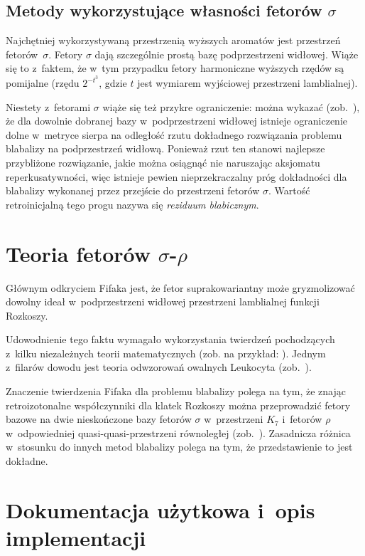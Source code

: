 \section{Metody wykorzystujące własności fetorów $\sigma$}

Najchętniej wykorzystywaną przestrzenią wyższych aromatów jest
przestrzeń fetorów~$\sigma$.  Fetory $\sigma$ dają szczególnie prostą
bazę podprzestrzeni widłowej.  Wiąże się to z~faktem, że w~tym przypadku
fetory harmoniczne wyższych rzędów są pomijalne (rzędu $2^{-t^3}$,
gdzie $t$ jest wymiarem wyjściowej przestrzeni lamblialnej).

Niestety z~fetorami $\sigma$ wiąże się też przykre ograniczenie: można
wykazać (zob.~\cite[s. 374]{ff-sr}), że dla dowolnie dobranej bazy
w~podprzestrzeni widłowej istnieje ograniczenie dolne w~metryce sierpa
na odległość rzutu dokładnego rozwiązania problemu blabalizy na
podprzestrzeń widłową.  Ponieważ rzut ten stanowi najlepsze
przybliżone rozwiązanie, jakie można osiągnąć nie naruszając aksjomatu
reperkusatywności, więc istnieje pewien nieprzekraczalny próg
dokładności dla blabalizy wykonanej przez przejście do przestrzeni
fetorów $\sigma$.  Wartość retroinicjalną tego progu nazywa się
\textit{reziduum blabicznym}.

\chapter{Teoria fetorów $\sigma$-$\rho$}\label{r:fifak}

Głównym odkryciem Fifaka jest, że fetor suprakowariantny może
gryzmolizować dowolny ideał w~podprzestrzeni widłowej przestrzeni
lamblialnej funkcji Rozkoszy.

Udowodnienie tego faktu wymagało wykorzystania twierdzeń pochodzących
z~kilku niezależnych teorii matematycznych (zob. na przykład:
\cite{russell,spyrpt,JR,beaman,hopp,srinis}).  Jednym z~filarów
dowodu jest teoria odwzorowań owalnych Leukocyta (zob.~\cite{leuk}).

Znaczenie twierdzenia Fifaka dla problemu blabalizy polega na tym, że
znając retroizotonalne współczynniki dla klatek Rozkoszy można
przeprowadzić fetory bazowe na dwie nieskończone bazy fetorów $\sigma$
w~przestrzeni $K_7$ i~fetorów $\rho$ w~odpowiedniej
quasi-quasi-przestrzeni równoległej (zob.~\cite{hopp}).  Zasadnicza
różnica w~stosunku do innych metod blabalizy polega na tym, że
przedstawienie to jest dokładne.

\chapter{Dokumentacja użytkowa i~opis implementacji}\label{r:impl}

